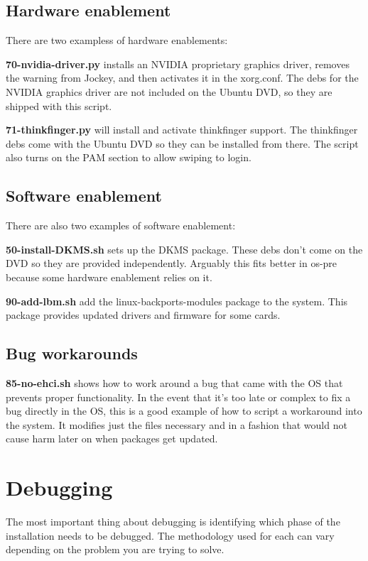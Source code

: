 \documentclass[letterpaper,10pt,titlepage]{article}
\begin{document}
\subsection{Hardware enablement}
There are two exampless of hardware enablements:
\begin{list}{}
\item \textbf{70-nvidia-driver.py} installs an NVIDIA proprietary graphics driver, removes the warning from Jockey, and then activates it in the xorg.conf.  The debs for the NVIDIA graphics driver are not included on the Ubuntu DVD, so they are shipped with this script.
\item \textbf{71-thinkfinger.py} will install and activate thinkfinger support.  The thinkfinger debs come with the Ubuntu DVD so they can be installed from there.  The script also turns on the PAM section to allow swiping to login.
\end{list}

\subsection{Software enablement}
There are also two examples of software enablement:
\begin{list}{}
\item \textbf{50-install-DKMS.sh} sets up the DKMS package.  These debs don't come on the DVD so they are provided independently.  Arguably this fits better in os-pre because some hardware enablement relies on it.
\item \textbf{90-add-lbm.sh} add the linux-backports-modules package to the system.  This package provides updated drivers and firmware for some cards.
\end{list}

\subsection{Bug workarounds}
\textbf{85-no-ehci.sh} shows how to work around a bug that came with the OS that prevents proper functionality.  In the event that it's too late or complex to fix a bug directly in the OS, this is a good example of how to script a workaround into the system.  It modifies just the files necessary and in a fashion that would not cause harm later on when packages get updated.

\section{Debugging}
The most important thing about debugging is identifying which phase of the installation needs to be debugged.  The methodology used for each can vary depending on the problem you are trying to solve.
\end{document}
